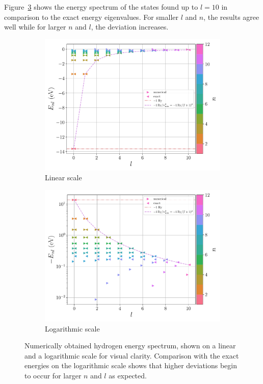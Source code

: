 \documentclass[a4paper,DIV=12,english]{scrartcl}
\begin{document}
Figure~\ref{fig:erg} shows the energy spectrum of the states found up to $l=10$ in comparison to the exact energy eigenvalues. For smaller $l$ and $n$, the results agree well while for larger $n$ and $l$, the deviation increases.

\begin{figure}
    \centering
    \begin{subfigure}{0.49\textwidth}
        \centering
        \includegraphics[width=\textwidth]{../plots/erg.pdf}
        \caption{Linear scale}
        \label{subfig:erg}
    \end{subfigure}
    \begin{subfigure}{0.49\textwidth}
        \centering
        \includegraphics[width=\textwidth]{../plots/erg_log.pdf}
        \caption{Logarithmic scale}
        \label{subfig:erglog}
    \end{subfigure}
    \caption{Numerically obtained hydrogen energy spectrum, shown on a linear and a logarithmic scale for visual clarity. Comparison with the exact energies on the logarithmic scale shows that higher deviations begin to occur for larger $n$ and $l$ as expected.}
    \label{fig:erg}
\end{figure}
\FloatBarrier
\end{document}
